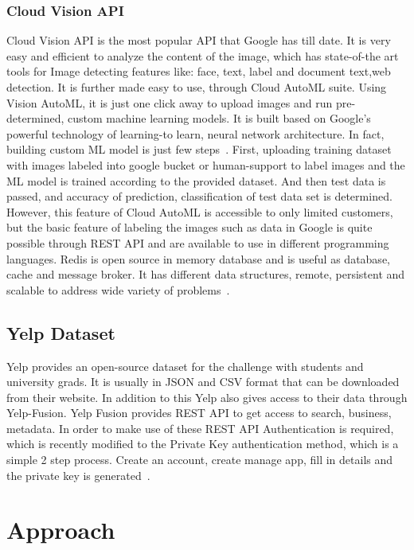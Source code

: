 \subsubsection{Cloud Vision API}

Cloud Vision API is the most popular API that Google has till date. It
is very easy and efficient to analyze the content of the image, which
has state-of-the art tools for Image detecting features like: face,
text, label and document text,web detection.  It is further made easy
to use, through Cloud AutoML suite. Using Vision AutoML, it is just
one click away to upload images and run pre-determined, custom machine
learning models. It is built based on Google’s powerful technology of
learning-to learn, neural network architecture. In fact, building
custom ML model is just few
steps~\cite{hid-sp18-602-cloud-automl}. First, uploading training
dataset with images labeled into google bucket or human-support to
label images and the ML model is trained according to the provided
dataset. And then test data is passed, and accuracy of prediction,
classification of test data set is determined. However, this feature
of Cloud AutoML is accessible to only limited customers, but the basic
feature of labeling the images such as data in Google is quite
possible through REST API and are available to use in different
programming languages.  Redis is open source in memory database and is
useful as database, cache and message broker. It has different data
structures, remote, persistent and scalable to address wide variety of
problems~\cite{hid-sp18-602-cloud-vision}.

\subsection{Yelp Dataset}

Yelp provides an open-source dataset for the challenge with students
and university grads. It is usually in JSON and CSV format that can be
downloaded from their website. In addition to this Yelp also gives
access to their data through Yelp-Fusion. Yelp Fusion provides REST
API to get access to search, business, metadata. In order to make use
of these REST API Authentication is required, which is recently
modified to the Private Key authentication method, which is a simple 2
step process. Create an account, create manage app, fill in details
and the private key is generated~\cite{hid-sp18-602-yelp}.

\section{Approach}

